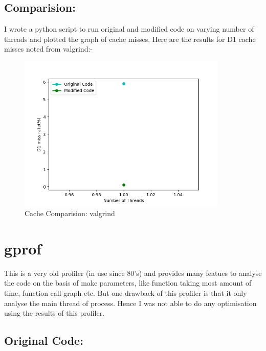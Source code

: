 \documentclass{article}
\begin{document}
\subsection{Comparision: }
I wrote a python script to run original and modified code on varying number of threads and plotted the graph of cache misses. Here are the results for D1 cache misses noted from valgrind:- \\
\begin{figure}[H]
    \centering
    \includegraphics[width=10cm]{cache-analysis-valgrind.png}
    \caption{Cache Comparision: valgrind}
\end{figure}

\section{gprof}
This is a very old profiler (in use since 80's) and provides many featues to analyse the code on the basis of make parameters, like function taking most amount of time, function call graph etc. But one drawback of this profiler is that it only analyse the main thread of process. Hence I was not able to do any optimisation using the results of this profiler.  
\subsection{Original Code: }
\end{document}
